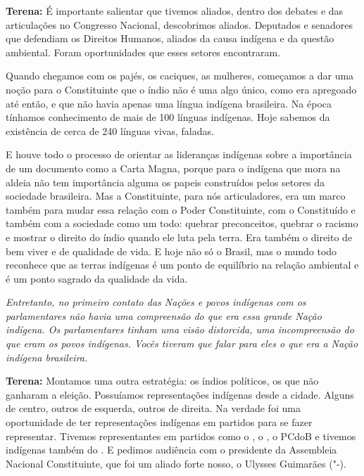 \textbf{Terena:} É importante salientar que tivemos aliados, dentro dos
debates e das articulações no Congresso Nacional, descobrimos aliados.
Deputados e senadores que defendiam os Direitos Humanos, aliados da
causa indígena e da questão ambiental. Foram oportunidades que esses
setores encontraram.

Quando chegamos com os pajés, os caciques, as mulheres, começamos a dar
uma noção para o Constituinte que o índio não é uma algo único, como era
apregoado até então, e que não havia apenas uma língua indígena
brasileira. Na época tínhamos conhecimento de mais de 100 línguas
indígenas. Hoje sabemos da existência de cerca de 240 línguas vivas,
faladas.

E houve todo o processo de orientar as lideranças indígenas sobre a
importância de um documento como a Carta Magna, porque para o indígena
que mora na aldeia não tem importância alguma os papeis construídos
pelos setores da sociedade brasileira. Mas a Constituinte, para nós
articuladores, era um marco também para mudar essa relação com o Poder
Constituinte, com o Constituído e também com a sociedade como um todo:
quebrar preconceitos, quebrar o racismo e mostrar o direito do índio
quando ele luta pela terra. Era também o direito de bem viver e de
qualidade de vida. E hoje não só o Brasil, mas o mundo todo reconhece
que as terras indígenas é um ponto de equilíbrio na relação ambiental e
é um ponto sagrado da qualidade da vida.

\emph{Entretanto, no primeiro contato das Nações e povos indígenas com
os parlamentares não havia uma compreensão do que era essa grande Nação
indígena. Os parlamentares tinham uma visão distorcida, uma
incompreensão do que eram os povos indígenas. Vocês tiveram que falar
para eles o que era a Nação indígena brasileira.}

\textbf{Terena:} Montamos uma outra estratégia: os índios políticos, os
que não ganharam a eleição. Possuíamos representações indígenas desde a
cidade. Alguns de centro, outros de esquerda, outros de direita. Na
verdade foi uma oportunidade de ter representações indígenas em partidos
para se fazer representar. Tivemos representantes em partidos como o ,
o , o PCdoB e tivemos indígenas também do . E pedimos audiência
com o presidente da Assembleia Nacional Constituinte, que foi um aliado
forte nosso, o Ulysses Guimarães ("-).

